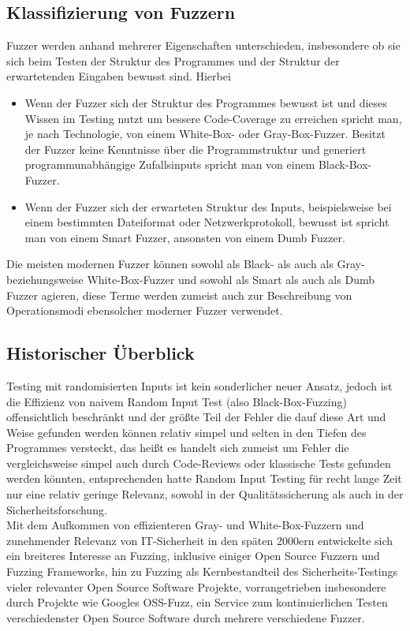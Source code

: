 \documentclass[12pt]{scrartcl}
\begin{document}
\subsection{Klassifizierung von Fuzzern}
Fuzzer werden anhand mehrerer Eigenschaften unterschieden, insbesondere ob sie sich beim Testen der Struktur des Programmes und der Struktur der erwartetenden Eingaben bewusst sind. Hierbei
\begin{itemize}
    \item Wenn der Fuzzer sich der Struktur des Programmes bewusst ist und dieses Wissen im Testing nutzt um bessere Code-Coverage zu erreichen spricht man, je nach Technologie, von einem White-Box- oder Gray-Box-Fuzzer. Besitzt der Fuzzer keine Kenntnisse über die Programmstruktur und generiert programmunabhängige Zufallsinputs spricht man von einem Black-Box-Fuzzer.
    \item Wenn der Fuzzer sich der erwarteten Struktur des Inputs, beispielsweise bei einem bestimmten Dateiformat oder Netzwerkprotokoll, bewusst ist spricht man von einem Smart Fuzzer, ansonsten von einem Dumb Fuzzer.
\end{itemize}
Die meisten modernen Fuzzer können sowohl als Black- als auch als Gray- beziehungsweise White-Box-Fuzzer und sowohl als Smart als auch als Dumb Fuzzer agieren, diese Terme werden zumeist auch zur Beschreibung von Operationsmodi ebensolcher moderner Fuzzer verwendet.

\subsection{Historischer Überblick}
Testing mit randomisierten Inputs ist kein sonderlicher neuer Ansatz, jedoch ist die Effizienz von naivem Random Input Test (also Black-Box-Fuzzing) offensichtlich beschränkt und der größte Teil der Fehler die dauf diese Art und Weise gefunden werden können relativ simpel und selten in den Tiefen des Programmes versteckt, das heißt es handelt sich zumeist um Fehler die vergleichsweise simpel auch durch Code-Reviews oder klassische Tests gefunden werden könnten, entsprechenden hatte Random Input Testing für recht lange Zeit nur eine relativ geringe Relevanz, sowohl in der Qualitätssicherung als auch in der Sicherheitsforschung.\\
Mit dem Aufkommen von effizienteren Gray- und White-Box-Fuzzern und zunehmender Relevanz von IT-Sicherheit in den späten 2000ern entwickelte sich ein breiteres Interesse an Fuzzing, inklusive einiger Open Source Fuzzern und Fuzzing Frameworks, hin zu Fuzzing als Kernbestandteil des Sicherheits-Testings vieler relevanter Open Source Software Projekte, vorrangetrieben insbesondere durch Projekte wie Googles OSS-Fuzz, ein Service zum kontinuierlichen Testen verschiedenster Open Source Software durch mehrere verschiedene Fuzzer.
\end{document}
